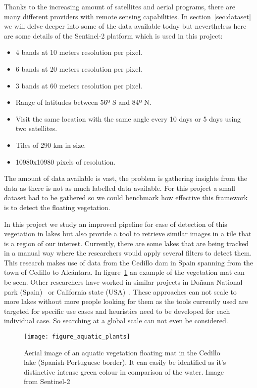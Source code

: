 \documentclass[conference]{IEEEtran}
\begin{document}
    Thanks to the increasing amount of satellites and aerial programs, there are many different providers with remote sensing capabilities.
    In section~\ref{sec:dataset} we will delve deeper into some of the data available today but nevertheless here are some details of the Sentinel-2 platform
    which is used in this project:
    \begin{itemize}
        \item 4 bands at 10 meters resolution per pixel.
        \item 6 bands at 20 meters resolution per pixel.
        \item 3 bands at 60 meters resolution per pixel.
        \item Range of latitudes between 56º S and 84º N.
        \item Visit the same location with the same angle every 10 days or 5 days using two satellites.
        \item Tiles of 290 km in size.
        \item 10980x10980 pixels of resolution.
    \end{itemize}
    The amount of data available is vast, the problem is gathering insights from the data as there is not as much labelled data
    available.
    For this project a small dataset had to be gathered so we could benchmark how effective this framework is to detect the
    floating vegetation.

    In this project we study an improved pipeline for ease of detection of this vegetation in lakes but also provide a tool
    to retrieve similar images in a tile that is a region of our interest.
    Currently, there are some lakes that are being tracked in a manual way where the researchers would apply several filters to detect them.
    This research makes use of data from the Cedillo dam in Spain spanning from the town of Cedillo to Alcántara.
    In figure~\ref{fig:satellite-image-airbus} an example of the vegetation mat can be seen.
    Other researchers have worked in similar projects in Doñana National park (Spain)~\cite{donyana1, donyana2} or California state (USA)~\cite{rs14133013}.
    These approaches can not scale to more lakes without more people looking for them as the tools currently used are targeted
    for specific use cases and heuristics need to be developed for each individual case.
    So searching at a global scale can not even be considered.

    \begin{figure}[h]
        \centering
        \texttt{[image: figure\_aquatic\_plants]}
        \caption{Aerial image of an aquatic vegetation floating mat in the Cedillo lake (Spanish-Portuguese border). It can easily be identified as it's distinctive
        intense green colour in comparison of the water. Image from Sentinel-2}
        \label{fig:satellite-image-airbus}
    \end{figure}
\end{document}

